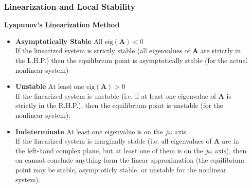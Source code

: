 \documentclass[11pt,handout]{beamer}   %
\begin{document}
\begin{frame}
\frametitle{Linearization and Local Stability}
\Large
\textbf{Lyapunov's Linearization Method}\\
\small
\begin{itemize}
\item \textbf{Asymptotically Stable} All $\text{eig}(\mathbf{A}) < 0$\\
\vspace{6pt}
If the linearized system is strictly stable (all eigenvalues of $\mathbf{A}$ are strictly in the L.H.P.) then the equilibrium point is asymptotically stable (for the actual nonlinear system)\\
\vspace{3pt}
\item \textbf{Unstable} At least one $\text{eig}(\mathbf{A}) > 0$\\
\vspace{6pt}
If the linearized system is unstable (i.e. if at least one eigenvalue of $\mathbf{A}$ is strictly in the R.H.P.), then the equilibrium point is unstable (for the nonlinear system).\\
\vspace{3pt}
\item \textbf{Indeterminate} At least one eigenvalue is on the $j\omega$ axis.\\
\vspace{6pt}
If the linearized system is marginally stable (i.e. all eigenvalues of $\mathbf{A}$ are in the left-hand complex plane, but at least one of them is on the $j\omega$ axis), then on cannot conclude anything form the linear approximation (the equilibrium point may be stable, asymptoticly stable, or unstable for the nonlinear system).
\end{itemize}
\end{frame}
\end{document}
